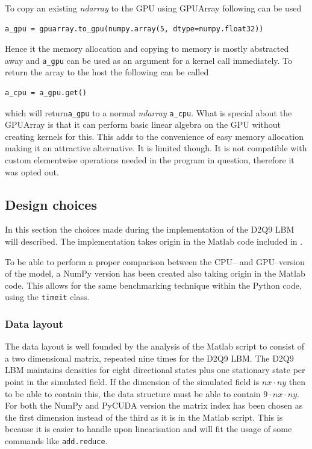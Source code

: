 To copy an existing \textit{ndarray} to the GPU using GPUArray following can be used

\begin{verbatim}
a_gpu = gpuarray.to_gpu(numpy.array(5, dtype=numpy.float32))
\end{verbatim}

Hence it the memory allocation and copying to memory is mostly abstracted away and \texttt{a\_gpu} can be used as an argument for a kernel call immediately. To return the array to the host the following can be called

\begin{verbatim}
a_cpu = a_gpu.get()
\end{verbatim}

which will return\texttt{a\_gpu} to a normal \textit{ndarray} \texttt{a\_cpu}. What is special about the GPUArray is that it can perform basic linear algebra on the GPU without creating kernels for this. This adds to the convenience of easy memory allocation making it an attractive alternative. It is limited though. It is not compatible with custom elementwise operations needed in the program in question, therefore it was opted out.



\subsection{Design choices}
In this section the choices made during the implementation of the D2Q9 LBM will described. The implementation takes origin in the Matlab code included in .

To be able to perform a proper comparison between the CPU-- and GPU--version of the model, a NumPy version has been created also taking origin in the Matlab code. This allows for the same benchmarking technique within the Python code, using the \texttt{timeit} class.



\subsubsection{Data layout}
The data layout is well founded by the analysis of the Matlab script to consist of a two dimensional matrix, repeated nine times for the D2Q9 LBM. The D2Q9 LBM maintains densities for eight directional states plus one stationary state per point in the simulated field. If the dimension of the simulated field is $nx \cdot ny$ then to be able to contain this, the data structure must be able to contain $9 \cdot nx \cdot ny$. For both the NumPy and PyCUDA version the matrix index has been chosen as the first dimension instead of the third as it is in the Matlab script. This is because it is easier to handle upon linearisation and will fit the usage of some commands like \texttt{add.reduce}.



